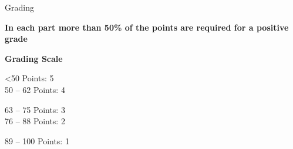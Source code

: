 \documentclass[aspectratio=169]{beamer}
\begin{document}
\begin{frame}{Grading}
    \begin{coloredblock}[blue]
        \centering\footnotesize\textbf{In each part more than 50\% of the points are required for a positive grade}
    \end{coloredblock}

    \vspace{0.5cm}
    \begin{coloredblock}[blue]
        \begin{minipage}[c]{0.24\textwidth}
            \centering\footnotesize \textbf{Grading Scale}
        \end{minipage}
        \hfill
        \begin{minipage}[c]{0.24\textwidth}
            \footnotesize
            <50 Points:         5\\
            50 – 62 Points:     4
        \end{minipage}
        \hfill
        \begin{minipage}[c]{0.24\textwidth}
            \footnotesize
            63 – 75 Points:     3\\
            76 – 88 Points:     2
        \end{minipage}
        \hfill
        \begin{minipage}[t]{0.24\textwidth}
            \footnotesize
            89 – 100 Points:    1
        \end{minipage}
        
    \end{coloredblock}

\end{frame}
\end{document}
